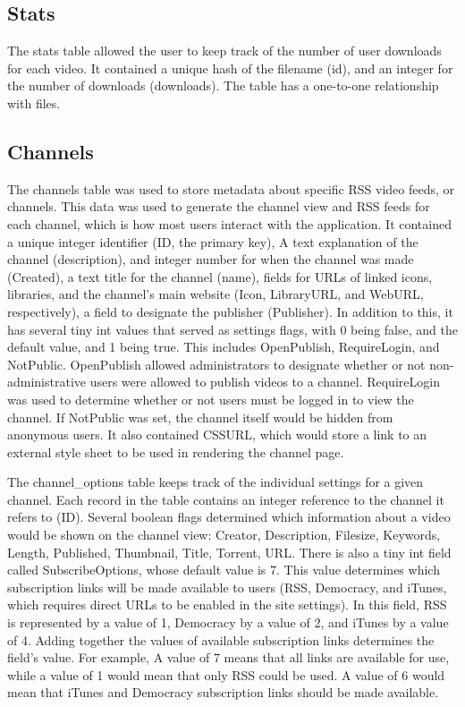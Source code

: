 \documentclass[a4paper,12pt]{report}
\begin{document}
\subsection{Stats}
The stats table allowed the user to keep track of the number of user downloads for each video. It contained a unique hash of the filename (id), and an integer for the number of downloads (downloads). The table has a one-to-one relationship with files.


\subsection{Channels}
The channels table was used to store metadata about specific RSS video feeds, or channels. This data was used to generate the channel view and RSS feeds for each channel, which is how most users interact with the application. 
It contained a unique integer identifier (ID, the primary key), A text explanation of the channel (description), and integer number for when the channel was made (Created), a text title for the channel (name), fields for URLs of linked icons, libraries, and the channel's main website (Icon, LibraryURL, and WebURL, respectively), a field to designate the publisher (Publisher). In addition to this, it has several tiny int values that served as settings flags, with 0 being false, and the default value, and 1 being true. This includes OpenPublish, RequireLogin, and NotPublic. OpenPublish allowed administrators to designate whether or not non-administrative users were allowed to publish videos to a channel. RequireLogin was used to determine whether or not users must be logged in to view the channel. If NotPublic was set, the channel itself would be hidden from anonymous users.
It also contained CSSURL, which would store a link to an external style sheet to be used in rendering the channel page.


The channel\_options table keeps track of the individual settings for a given channel. Each record in the table contains an integer reference to the channel it refers to (ID). Several boolean flags determined which information about a video would be shown on the channel view: Creator, Description, Filesize, Keywords, Length, Published, Thumbnail, Title, Torrent, URL. There is also a tiny int field called SubscribeOptions, whose default value is 7. This value determines which subscription links will be made available to users (RSS, Democracy, and iTunes, which requires direct URLs to be enabled in the site settings). In this field, RSS is represented by a value of 1, Democracy by a value of 2, and iTunes by a value of 4. Adding together the values of available subscription links determines the field's value. For example, A value of 7 means that all links are available for use, while a value of 1 would mean that only RSS could be used. A value of 6 would mean that iTunes and Democracy subscription links should be made available. 
\end{document}
